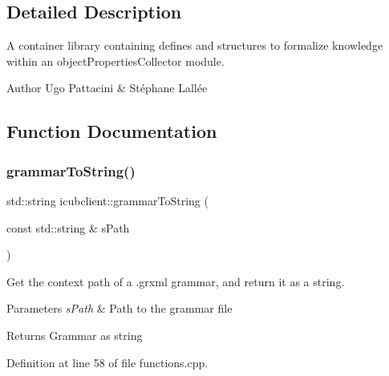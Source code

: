 \subsection{Detailed Description}
A container library containing defines and structures to formalize knowledge within an object\+Properties\+Collector module. 

\begin{DoxyAuthor}{Author}
Ugo Pattacini \& Stéphane Lallée 
\end{DoxyAuthor}


\subsection{Function Documentation}
\mbox{\label{group__icubclient__helpers_gaf5d181da46b2680f90cb7b0df1fd7068}} 
\subsubsection{\texorpdfstring{grammar\+To\+String()}{grammarToString()}}
{\footnotesize\ttfamily std\+::string icubclient\+::grammar\+To\+String (\begin{DoxyParamCaption}\item[{const std\+::string \&}]{s\+Path }\end{DoxyParamCaption})}



Get the context path of a .grxml grammar, and return it as a string. 


\begin{DoxyParams}{Parameters}
{\em s\+Path} & Path to the grammar file \\
\hline
\end{DoxyParams}
\begin{DoxyReturn}{Returns}
Grammar as string 
\end{DoxyReturn}


Definition at line 58 of file functions.\+cpp.

\mbox{\label{group__icubclient__helpers_ga8acf76546a060893d573c697403e4196}} 
